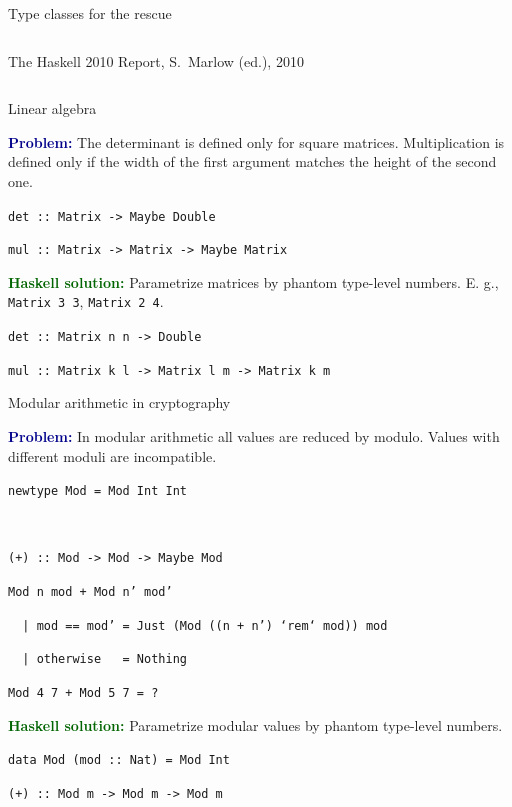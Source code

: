 \documentclass[handout]{beamer}
\def\problem{\textcolor{darkblue}{\bf Problem:} }
\def\solution{\textcolor{darkgreen}{\bf Haskell solution:} }
\begin{document}
\begin{frame}{Type classes for the rescue}
\begin{columns}[onlytextwidth,T]
\begin{column}{.5\linewidth}
    \vspace{-3.5ex}

    \begin{flushright}
      {\tiny
      The Haskell 2010 Report, S.~Marlow (ed.), 2010
      }
    \end{flushright}
  \end{column}
\end{columns}

\end{frame}

\begin{frame}{Linear algebra}

\problem
The determinant is defined only for square matrices.
Multiplication is defined only if the width of the first argument
matches the height of the second one.

\medskip

{\tt det :: Matrix -> Maybe Double} \par
{\tt mul :: Matrix -> Matrix -> Maybe Matrix}

\bigskip

\pause

\solution
Parametrize matrices by phantom type-level numbers.
E. g., {\tt Matrix 3 3}, {\tt Matrix 2 4}.

\medskip

{\tt det :: Matrix n n -> Double} \par
{\tt mul :: Matrix k l -> Matrix l m -> Matrix k m}

\end{frame}

\begin{frame}{Modular arithmetic in cryptography}

\problem
In modular arithmetic all values
are reduced by modulo. Values with different moduli
are incompatible.

\medskip

{\tt newtype Mod = Mod Int Int } \par
~\par
{\tt (+) :: Mod -> Mod -> Maybe Mod } \par
{\tt Mod n mod + Mod n' mod'  } \par
{\tt ~ | mod == mod' = Just (Mod ((n + n') `rem` mod)) mod } \par
{\tt ~ | otherwise ~ = Nothing}

\medskip
{\tt Mod 4 7 + Mod 5 7 = ?}

\bigskip

\pause

\solution
Parametrize modular values by phantom type-level numbers.

\medskip

{\tt data Mod (mod :: Nat) = Mod Int } \par
{\tt (+) :: Mod m -> Mod m -> Mod m } \par

\end{frame}
\end{document}
